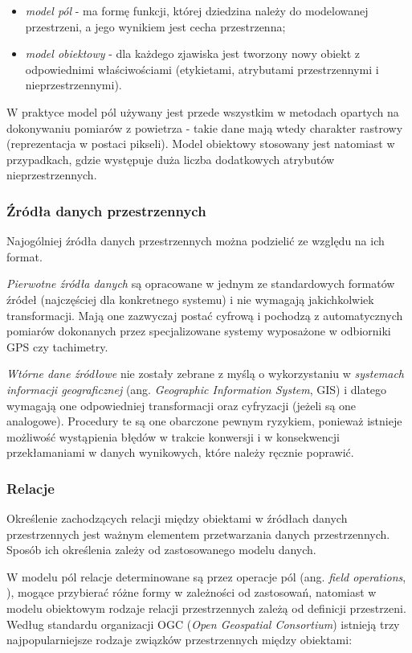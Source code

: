 \documentclass[12pt]{article}
\begin{document}
\begin{itemize}
\item \textit{model pól} - ma formę funkcji, której dziedzina należy do modelowanej przestrzeni, a jego wynikiem jest cecha przestrzenna;
\item \textit{model obiektowy} - dla każdego zjawiska jest tworzony nowy obiekt z odpowiednimi właściwościami (etykietami, atrybutami przestrzennymi i nieprzestrzennymi).
\end{itemize}

W praktyce model pól używany jest przede wszystkim w metodach opartych na dokonywaniu pomiarów z powietrza - takie dane mają wtedy charakter rastrowy (reprezentacja w postaci pikseli). Model obiektowy stosowany jest natomiast w przypadkach, gdzie występuje duża liczba dodatkowych atrybutów nieprzestrzennych.

\subsubsection{Źródła danych przestrzennych}

Najogólniej źródła danych przestrzennych można podzielić ze względu na ich format.

\textit{Pierwotne źródła danych} są opracowane w jednym ze standardowych formatów źródeł (najczęściej dla konkretnego systemu) i nie wymagają jakichkolwiek transformacji. Mają one zazwyczaj postać cyfrową i pochodzą z automatycznych pomiarów dokonanych przez specjalizowane systemy wyposażone w odbiorniki GPS czy tachimetry.

\textit{Wtórne dane źródłowe} nie zostały zebrane z myślą o wykorzystaniu w \textit{systemach informacji geograficznej} (ang. \textit{Geographic Information System}, GIS) i dlatego wymagają one odpowiedniej transformacji oraz cyfryzacji (jeżeli są one analogowe). Procedury te są one obarczone pewnym ryzykiem, ponieważ istnieje możliwość wystąpienia błędów w trakcie konwersji i w konsekwencji przekłamaniami w danych wynikowych, które należy ręcznie poprawić.

\subsubsection{Relacje}

Określenie zachodzących relacji między obiektami w źródłach danych przestrzennych jest ważnym elementem przetwarzania danych przestrzennych. Sposób ich określenia zależy od zastosowanego modelu danych.

W modelu pól relacje determinowane są przez operacje pól (ang. \textit{field operations}, \cite{fieldmodel}), mogące przybierać różne formy w zależności od zastosowań, natomiast w modelu obiektowym rodzaje relacji przestrzennych zależą od definicji przestrzeni. Według standardu organizacji OGC (\textit{Open Geospatial Consortium}) istnieją trzy najpopularniejsze rodzaje związków przestrzennych między obiektami:
\end{document}
